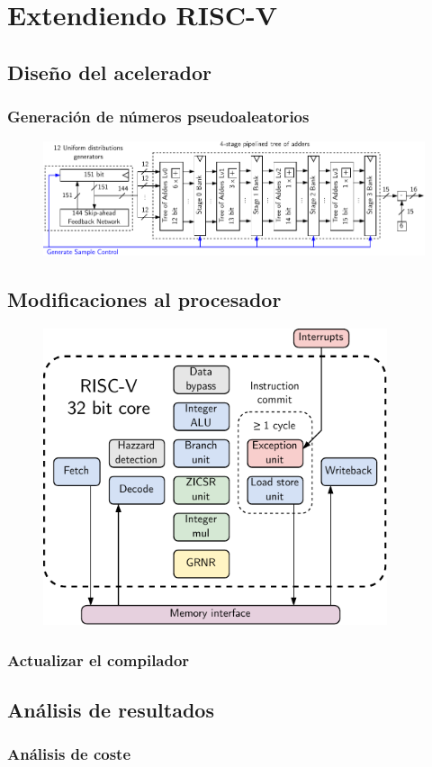 \chapter{Extendiendo RISC-V}

\section{Diseño del acelerador}

\subsection{Generación de números pseudoaleatorios}

\begin{figure}[h]
    \centering
    \includegraphics[width=\textwidth]{Imagenes/grng.pdf}
    \caption{\todo}
    \label{fig:aa}
\end{figure}

\section{Modificaciones al procesador}

\begin{figure}[h]
    \centering
    \includegraphics[width=0.9\textwidth]{Imagenes/riscv_core_extended.pdf}
    \caption{\todo}
    \label{fig:bb}
\end{figure}


\subsection{Actualizar el compilador}

\section{Análisis de resultados}

\subsection{Análisis de coste}
